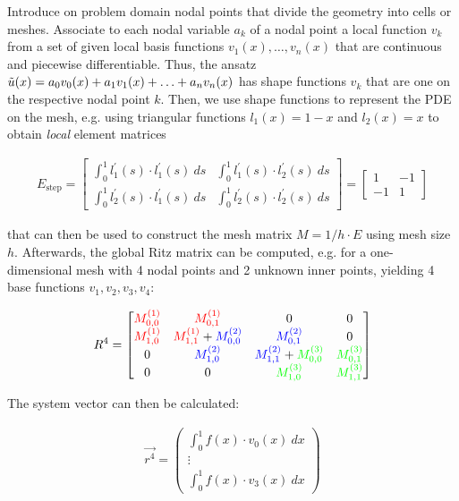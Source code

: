 Introduce on problem domain nodal points that divide the geometry into cells or meshes.
Associate to each nodal variable $a_k$ of a nodal point a local function $v_k$ from 
a set of given local basis functions $v_1(x), \ldots, v_n(x)$ that are continuous and piecewise differentiable.
Thus, the ansatz $\tilde{u}(x) = a_0v_0(x)+a_1v_1(x)+\ldots+a_nv_n(x)$ has shape functions $v_k$ that are one on
the respective nodal point $k$.
Then, we use shape functions to represent the PDE on the mesh,
e.g. using triangular functions $l_1(x)=1-x$ and $l_2(x) = x$ to obtain \emph{local} element matrices
\begin{snugshade*}
\begin{align*}
	E_\text{step} = 
	\begin{bmatrix}
		\int_0^1 l_1^\prime(s)\cdot l_1^\prime(s)\ ds & \int_0^1 l_1^\prime(s)\cdot l_2^\prime(s)\ ds \\
		\int_0^1 l_2^\prime(s)\cdot l_1^\prime(s)\ ds & \int_0^1 l_2^\prime(s)\cdot l_2^\prime(s)\ ds
	\end{bmatrix}
	=
	\begin{bmatrix}
		1 & -1 \\
		-1 & 1
	\end{bmatrix}
\end{align*}    
\end{snugshade*}


that can then be used to construct the mesh matrix $M=1/h\cdot E$ using mesh size $h$.
Afterwards, the global Ritz matrix can be computed, e.g. for a one-dimensional mesh with 4 nodal points and 2 unknown inner points,
yielding 4 base functions $v_1,v_2,v_3,v_4$:

\begin{align*}
	R^4 = \begin{bmatrix}
		{\color{red} M^{(1)}_{0,0}} & \color{red}{M^{(1)}_{0,1}} & 0 & 0 \\
		{\color{red} M^{(1)}_{1,0}} & {\color{red} M^{(1)}_{1,1}} + {\color{blue} M^{(2)}_{0,0}} & {\color{blue} M^{(2)}_{0,1}} & 0 \\
		0 & {\color{blue} M^{(2)}_{1,0}} & {\color{blue} M^{(2)}_{1,1}} + {\color{green} M^{(3)}_{0,0}} & {\color{green} M^{(3)}_{0,1}} \\
		0 & 0 & {\color{green} M^{(3)}_{1,0}} & {\color{green} M^{(3)}_{1,1}}
	\end{bmatrix}
\end{align*}

The system vector can then be calculated:

\begin{align*}
	\vec{r^4} = \begin{pmatrix}
		\int_0^1 f(x)\cdot v_0(x)\ dx \\
		\vdots \\
		\int_0^1 f(x)\cdot v_3(x)\ dx
	\end{pmatrix}
\end{align*}


